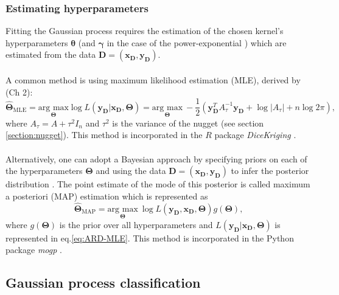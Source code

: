 \documentclass{article}
\newcommand{\inputVec}{\mathbf{x}}
\newcommand{\outputVec}{\mathbf{y}}
\newcommand{\designInput}{\inputVec_\design}
\newcommand{\designOutput}{\outputVec_\design}
\newcommand{\design}{\mathbf{D}}
\newcommand{\corrMatrix}{A}
\newcommand{\nugVar}{\tau^2}
\newcommand{\nugSD}{\tau}
\newcommand{\lengthscale}{\mathbf{\theta}}
\newcommand{\hyp}{\mathbf{\Theta}}
\newcommand{\hypEst}{\hat{\mathbf{\Theta}}}
\newcommand{\likelihood}{L}
\newcommand{\numDPs}{n}
\begin{document}
\subsubsection{Estimating hyperparameters}
\label{section:hyperparameters}
Fitting the Gaussian process requires the estimation of the chosen kernel's hyperparameters $\lengthscale$ (and $\mathbf{\gamma}$ in the case of the power-exponential \citep{Kennedy2001}) which are estimated from the data $\design = (\designInput,\designOutput)$.\\\\
A common method is using maximum likelihood estimation (MLE), derived by \citet{Rasmussen_Williams_2006}(Ch 2):
\begin{equation}
    \label{eq:ARD-MLE}
    \hypEst_{\text{MLE}} = \underset{\hyp}{\text{arg max}} \log \likelihood(\designOutput|\designInput,\hyp) = \underset{\hyp}{\text{arg max}} \ -\frac{1}{2} \left(\designOutput^T \corrMatrix_{\nugSD}^{-1} \mathbf{\designOutput} + \log|\corrMatrix_\nugSD| + \numDPs \log 2\pi \right),
\end{equation}
where $\corrMatrix_\nugSD = \corrMatrix + \nugVar I_\numDPs$ and $\nugVar$ is the variance of the nugget (see section \ref{section:nugget}). This method is incorporated in the $R$ package {\it DiceKriging} \citep{DiceKriging}.\\\\
Alternatively, one can adopt a Bayesian approach by specifying priors on each of the hyperparameters $\hyp$ and using the data $\design = (\designInput,\designOutput)$ to infer the posterior distribution \citep{Higdon2004}. The point estimate of the mode of this posterior is called maximum a posteriori (MAP) estimation which is represented as
\begin{equation}
    \hypEst_{\text{MAP}} = \underset{\hyp}{\text{arg max}} \ \log \likelihood(\designOutput,\designInput,\hyp) g(\hyp),
    \label{eq:ARD-MAP}
\end{equation}
where $g(\hyp)$ is the prior over all hyperparameters and $\likelihood(\designOutput|\designInput,\hyp)$ is represented in eq.\eqref{eq:ARD-MLE}. This method is incorporated in the Python package {\it mogp} \citep{mogptk}.
\subsection{Gaussian process classification}
\label{section:GPC}
\end{document}
